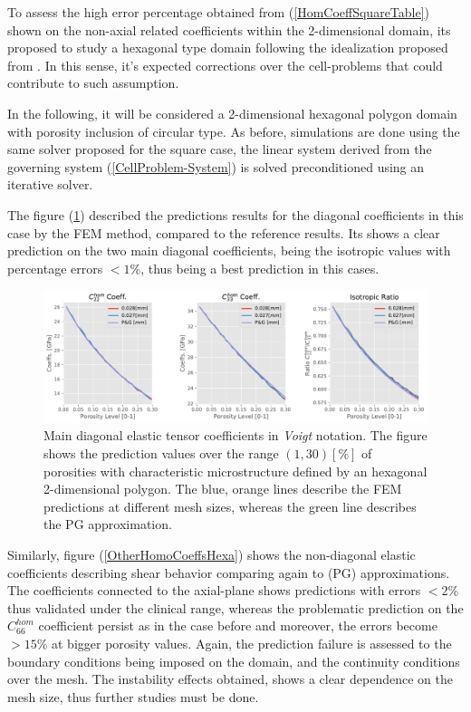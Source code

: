 To assess the high error percentage obtained from (\ref{HomCoeffSquareTable}) shown on the non-axial related coefficients within the 2-dimensional domain, its proposed to study a hexagonal type domain following the idealization proposed from \cite{Parnell2008}. In this sense, it's expected corrections over the cell-problems that could contribute to such assumption.

In the following, it will be considered a 2-dimensional hexagonal polygon domain with porosity inclusion of circular type. As before, simulations are done using the same solver proposed for the square case, the linear system derived from the governing system (\ref{CellProblem-System}) is solved preconditioned using an iterative solver.

The figure (\ref{MainHomCoeffHexa}) described the predictions results for the diagonal coefficients in this case by the FEM method, compared to the reference results. Its shows a clear prediction on the two main diagonal coefficients, being the isotropic values with percentage errors $< 1 \%$, thus being a best prediction in this cases.
\begin{figure}[!h]
	\centering
	\includegraphics[scale=.5]{images/CellsProb/CellProb_MainHomCoeffsCircularHexa.pdf}
	\caption{Main diagonal elastic tensor coefficients in \textit{Voigt} notation. The figure shows the prediction values over the range $(1,30) [\%]$ of porosities with characteristic microstructure defined by an hexagonal 2-dimensional polygon. The blue, orange lines describe the FEM predictions at different mesh sizes, whereas the green line describes the PG approximation.}
	\label{MainHomCoeffHexa}
\end{figure}
Similarly, figure (\ref{OtherHomoCoeffsHexa}) shows the non-diagonal elastic coefficients describing shear behavior comparing again to (PG) approximations. The coefficients connected to the axial-plane shows predictions with errors $< 2 \%$ thus validated under the clinical range, whereas the problematic prediction on the $C_{66}^{hom}$ coefficient persist as in the case before and moreover, the errors become $> 15 \%$ at bigger porosity values. Again, the prediction failure is assessed to the boundary conditions being imposed on the domain, and the continuity conditions over the mesh. The instability effects obtained, shows a clear dependence on the mesh size, thus further studies must be done.

